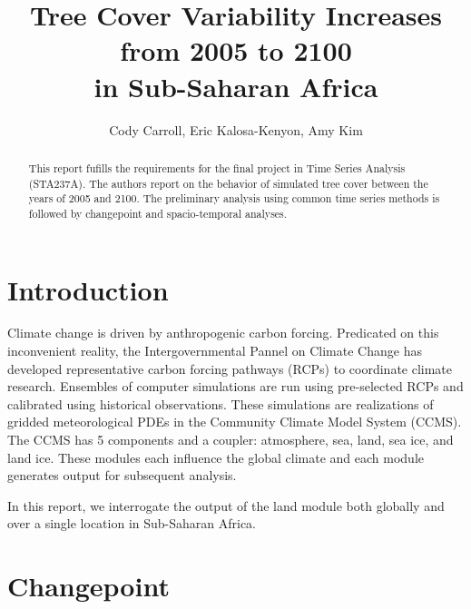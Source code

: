 \documentclass[11pt]{article}
\title{Tree Cover Variability Increases from 2005 to 2100\\ in Sub-Saharan Africa}
\author{Cody Carroll, Eric Kalosa-Kenyon, Amy Kim}
\begin{document}
\maketitle

\begin{abstract}
This report fufills the requirements for the final project in Time Series
    Analysis (STA237A). The authors report on the behavior of simulated tree
    cover between the years of 2005 and 2100. The preliminary analysis using
    common time series methods is followed by changepoint and spacio-temporal
    analyses.
\end{abstract}

\section{Introduction}
Climate change is driven by anthropogenic carbon forcing. Predicated on this
inconvenient reality, the Intergovernmental Pannel on Climate Change has
developed representative carbon forcing pathways (RCPs) to coordinate
climate research. Ensembles of computer simulations are run using pre-selected
RCPs and calibrated using historical observations. These simulations are
realizations of gridded meteorological PDEs in the Community Climate Model
System (CCMS). The CCMS has 5 components and a coupler: atmosphere, sea, land,
sea ice, and land ice. These modules each influence the global climate and each
module generates output for subsequent analysis.

In this report, we interrogate the output of the land module both globally and
over a single location in Sub-Saharan Africa.

\section{Changepoint}
\end{document}
